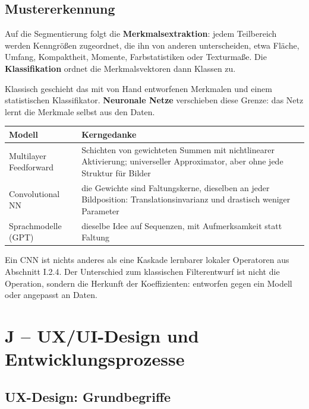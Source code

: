 \documentclass[12pt, a4paper]{article}
\begin{document}
\subsection{Mustererkennung}

Auf die Segmentierung folgt die \textbf{Merkmalsextraktion}: jedem Teilbereich werden
Kenngrößen zugeordnet, die ihn von anderen unterscheiden, etwa Fläche, Umfang,
Kompaktheit, Momente, Farbstatistiken oder Texturmaße. Die \textbf{Klassifikation}
ordnet die Merkmalsvektoren dann Klassen zu.

Klassisch geschieht das mit von Hand entworfenen Merkmalen und einem statistischen
Klassifikator. \textbf{Neuronale Netze} verschieben diese Grenze: das Netz lernt die
Merkmale selbst aus den Daten.

\begin{center}
\begin{tabular}{@{}p{4.2cm}p{8.8cm}@{}}
\toprule
\textbf{Modell} & \textbf{Kerngedanke} \\
\midrule
Multilayer Feedforward & Schichten von gewichteten Summen mit nichtlinearer
Aktivierung; universeller Approximator, aber ohne jede Struktur für Bilder \\
Convolutional NN & die Gewichte sind Faltungskerne, dieselben an jeder Bildposition:
Translationsinvarianz und drastisch weniger Parameter \\
Sprachmodelle (GPT) & dieselbe Idee auf Sequenzen, mit Aufmerksamkeit statt Faltung \\
\bottomrule
\end{tabular}
\end{center}

\begin{notebox}
Ein CNN ist nichts anderes als eine Kaskade lernbarer lokaler Operatoren aus Abschnitt
I.2.4. Der Unterschied zum klassischen Filterentwurf ist nicht die Operation, sondern
die Herkunft der Koeffizienten: entworfen gegen ein Modell oder angepasst an Daten.
\end{notebox}

\section{J -- UX/UI-Design und Entwicklungsprozesse}

\subsection{UX-Design: Grundbegriffe}
\end{document}
